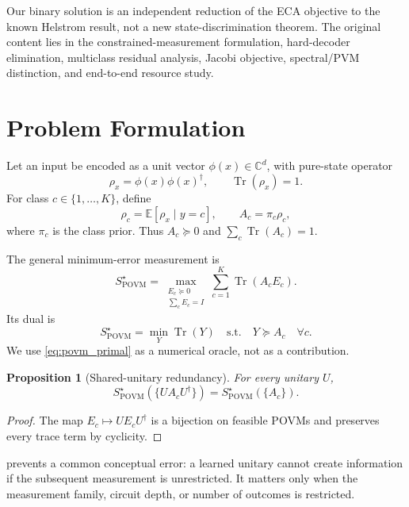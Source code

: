 \documentclass[10pt,twocolumn]{article}
\newtheorem{proposition}[theorem]{Proposition}
\theoremstyle{definition}
\theoremstyle{remark}
\newcommand{\Tr}{\operatorname{Tr}}
\newcommand{\E}{\mathbb{E}}
\newcommand{\C}{\mathbb{C}}
\begin{document}
Our binary solution is an independent reduction of the ECA objective to the
known Helstrom result, not a new state-discrimination theorem.  The original
content lies in the constrained-measurement formulation, hard-decoder
elimination, multiclass residual analysis, Jacobi objective, spectral/PVM
distinction, and end-to-end resource study.

\section{Problem Formulation}
\label{sec:problem}

Let an input be encoded as a unit vector
$\phi(x)\in\C^d$, with pure-state operator
\begin{equation}
  \rho_x=\phi(x)\phi(x)^\dagger,\qquad \Tr(\rho_x)=1.
\end{equation}
For class $c\in\{1,\ldots,K\}$, define
\begin{equation}
  \rho_c=\E[\rho_x\mid y=c],\qquad A_c=\pi_c\rho_c,
  \label{eq:class_operators}
\end{equation}
where $\pi_c$ is the class prior.  Thus $A_c\succeq0$ and
$\sum_c\Tr(A_c)=1$.

The general minimum-error measurement is
\begin{equation}
  S_{\mathrm{POVM}}^\star
  =
  \max_{\substack{E_c\succeq0\\\sum_cE_c=I}}
  \sum_{c=1}^K \Tr(A_cE_c).
  \label{eq:povm_primal}
\end{equation}
Its dual is
\begin{equation}
  S_{\mathrm{POVM}}^\star
  =
  \min_Y \Tr(Y)
  \quad\text{s.t.}\quad Y\succeq A_c\quad\forall c.
  \label{eq:povm_dual}
\end{equation}
We use \cref{eq:povm_primal} as a numerical oracle, not as a contribution.

\begin{proposition}[Shared-unitary redundancy]
\label{prop:unitary_redundancy}
For every unitary $U$,
\[
S_{\mathrm{POVM}}^\star(\{UA_cU^\dagger\})
=S_{\mathrm{POVM}}^\star(\{A_c\}).
\]
\end{proposition}
\begin{proof}
The map $E_c\mapsto UE_cU^\dagger$ is a bijection on feasible POVMs and
preserves every trace term by cyclicity.
\end{proof}

 prevents a common conceptual error: a learned
unitary cannot create information if the subsequent measurement is
unrestricted.  It matters only when the measurement family, circuit depth, or
number of outcomes is restricted.
\end{document}
